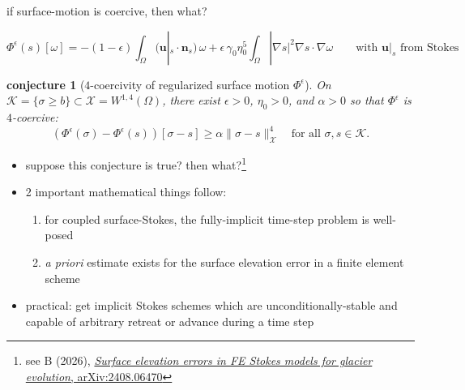 \documentclass[aspectratio=169,10pt]{beamer}
\newtheorem{conjecture}[theorem]{conjecture}
\newcommand{\bn}{\mathbf{n}}
\newcommand{\bu}{\mathbf{u}}
\newcommand{\cK}{{\mathcal{K}}}
\newcommand{\cX}{{\mathcal{X}}}
\newcommand{\eps}{\epsilon}
\newcommand{\grad}{\nabla}
\begin{document}
\begin{frame}{if surface-motion is coercive, then what?}

{\small
$$\Phi^\eps(s)[\omega] = -(1-\eps)\int_\Omega (\bu|_s \cdot \bn_s)\, \omega +\eps\,\gamma_0\eta_0^{5}\int_\Omega|\grad s|^{2}\grad s\cdot\grad\omega \qquad \text{with $\bu|_s$ from Stokes}$$

\begin{conjecture}[$4$-coercivity of regularized surface motion $\Phi^\eps$]
On $\cK = \{\sigma \ge b\} \subset \cX=W^{1,4}(\Omega)$, there exist $\eps>0$, $\eta_0>0$, and $\alpha>0$ so that $\Phi^\eps$ is $4$-coercive:
    $$\left(\Phi^\eps(\sigma)-\Phi^\eps(s)\right)[\sigma-s]\ge\alpha\|\sigma-s\|_\cX^4 \quad \text{for all } \sigma,s\in\cK.$$
\end{conjecture}
}

\smallskip
\begin{itemize}
\item suppose this conjecture is true?  then what?\footnote{see B (2026), \href{https://arxiv.org/abs/2408.06470}{\emph{Surface elevation errors in FE Stokes models for glacier evolution}, arXiv:2408.06470}}

\pause
\smallskip
\item 2 important mathematical things follow:
   \begin{enumerate}
   \item for coupled surface-Stokes, the fully-implicit time-step problem is well-posed
   \item \emph{a priori} estimate exists for the surface elevation error in a finite element scheme
   \end{enumerate}
\item practical: get implicit Stokes schemes which are unconditionally-stable and capable of arbitrary retreat or advance during a time step
\end{itemize}
\end{frame}
\end{document}
